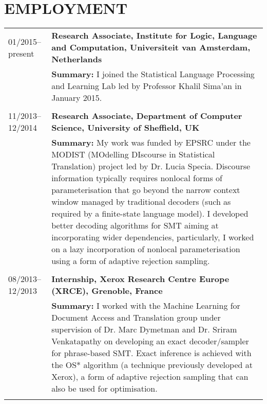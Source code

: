 \section*{EMPLOYMENT}

\begin{tabular}{p{2.92cm}  p{13cm}}
01/2015--present & \bf Research Associate, Institute for Logic, Language and Computation, Universiteit van Amsterdam, Netherlands \\
	& {\bf Summary:} I joined the Statistical Language Processing and Learning Lab led by Professor Khalil Sima'an in January 2015. 
	 \\
    & \\
11/2013--12/2014 & \bf Research Associate, Department of Computer Science, University of Sheffield, UK \\
	& {\bf Summary:} My work was funded by EPSRC under the MODIST (MOdelling DIscourse in Statistical Translation) project led by Dr. Lucia Specia. Discourse information typically requires nonlocal forms of parameterisation that go beyond the narrow context window managed by traditional decoders (such as required by a finite-state language model). I developed better decoding algorithms for SMT aiming at incorporating wider dependencies, particularly, I worked on a lazy incorporation of nonlocal parameterisation using a form of adaptive rejection sampling. 
	 \\
    & \\
08/2013--12/2013	& \bf Internship, Xerox Research Centre Europe (XRCE), Grenoble, France \\
	& {\bf Summary:} I worked with the Machine Learning for Document Access and Translation group under supervision of Dr. Marc Dymetman and Dr. Sriram Venkatapathy  on developing an exact decoder/sampler for phrase-based SMT. Exact inference is achieved with the OS* algorithm (a technique previously developed at Xerox), a form of adaptive rejection sampling that can also be used for optimisation. \\
	& \\

\end{tabular}
